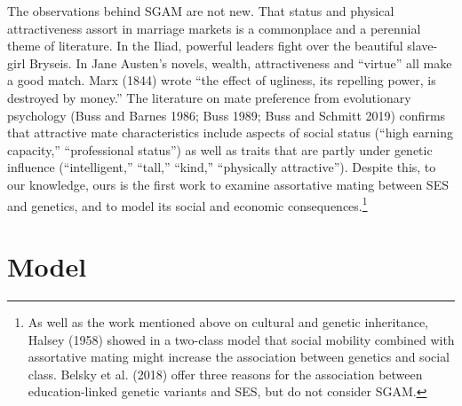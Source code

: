 \documentclass[
  12pt,
]{article}
\theoremstyle{definition}
\theoremstyle{definition}
\theoremstyle{definition}
\theoremstyle{definition}
\theoremstyle{remark}
\begin{document}
The observations behind SGAM are not new. That status and physical
attractiveness assort in marriage markets is a commonplace and a perennial theme
of literature. In the Iliad, powerful leaders fight over the beautiful
slave-girl Bryseis. In Jane Austen's novels, wealth, attractiveness and ``virtue''
all make a good match. Marx (1844) wrote ``the effect of ugliness, its repelling
power, is destroyed by money.'' The literature on mate preference from evolutionary
psychology (Buss and Barnes 1986; Buss 1989; Buss and Schmitt 2019) confirms
that attractive mate characteristics include aspects of social status (``high
earning capacity,'' ``professional status'') as well as traits that are partly
under genetic influence (``intelligent,'' ``tall,'' ``kind,'' ``physically
attractive''). Despite this, to our knowledge, ours is the first work to examine
assortative mating between SES and genetics, and to model its social and
economic consequences.\footnote{As well as the work mentioned above on cultural and
  genetic inheritance, Halsey (1958) showed in a two-class model that
  social mobility combined with assortative mating might increase the association
  between genetics and social class. Belsky et al. (2018) offer three reasons for
  the association between education-linked genetic variants and SES, but do not
  consider SGAM.}

\hypertarget{model}{%
\section{Model}\label{model}}
\end{document}
